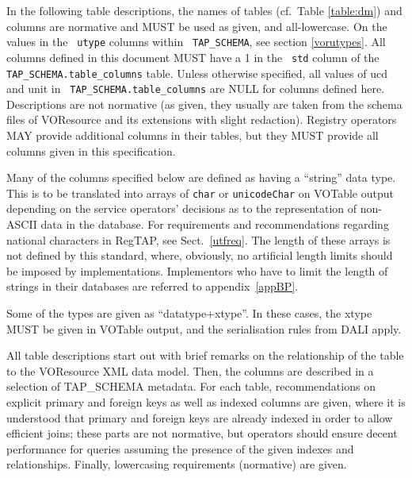 \documentclass[11pt,a4paper]{ivoa}
\newcommand{\tapent}[1]{\texttt{\color{tapcolor} #1}}
\begin{document}
\label{vortables}

In the following table descriptions, the names of tables
(cf.~Table \ref{table:dm}) and columns
are normative and MUST be used as given, and all-lowercase.  On the
values in the \tapent{utype} columns within \tapent{TAP\_SCHEMA},
see section \ref{vorutypes}.  All columns defined in
this document MUST have a 1 in the \tapent{std} column of the
\tapent{TAP\_SCHEMA.table\_columns} table.  Unless otherwise
specified, all values of ucd and unit in
\tapent{TAP\_SCHEMA.table\_columns} are NULL for columns defined here.
Descriptions are not normative (as given, they usually are taken from
the schema files of VOResource and its extensions with slight
redaction).  Registry operators MAY provide additional columns in their
tables, but they MUST provide all columns given in this
specification.

Many of the columns specified below are defined as having a ``string'' 
data type.  This is to be translated into arrays of \texttt{char} or
\texttt{unicodeChar} on VOTable output depending on the service
operators' decisions as to the representation of non-ASCII data in the
database.  For requirements and recommendations regarding national
characters in RegTAP, see Sect.~\ref{utfreq}.  The length of these
arrays is not defined by this standard, where, obviously, no artificial
length limits should be imposed by implementations.  Implementors who have
to limit the length of strings in their databases are referred to
appendix~\ref{appBP}.

Some of the types are given as ``datatype+xtype''.  In these cases, the
xtype MUST be given in VOTable output, and the serialisation rules from
DALI \citep{2017ivoa.spec.0517D} apply.

All table descriptions start out with brief remarks on the
relationship of the table to the VOResource XML data model.  Then, the
columns are described in a selection of TAP\_SCHEMA metadata. For each
table, recommendations on explicit primary and foreign keys as well as
indexed columns are given, where it is understood that primary and
foreign keys are already indexed in order to allow efficient joins;
these parts are not normative, but operators should ensure decent
performance for queries assuming the presence of the given indexes and
relationships.  Finally, lowercasing requirements
(normative) are given.
\end{document}
